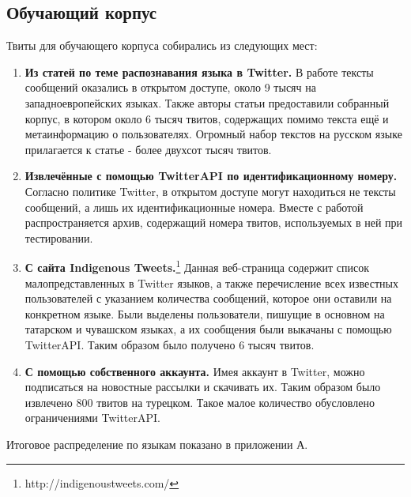 \documentclass[a4paper, 14pt]{article}
\begin{document}
		\subsection{Обучающий корпус}   
			Твиты для обучающего корпуса собирались из следующих мест:
			\begin{enumerate}
				\item \textbf{Из статей по теме распознавания языка в Twitter.} В работе \cite{liga} тексты сообщений оказались в открытом доступе, около 9 тысяч на западноевропейских языках. Также авторы статьи \cite{ppm} предоставили собранный корпус, в котором около 6 тысяч твитов, содержащих помимо текста ещё и метаинформацию о пользователях. Огромный набор текстов на русском языке прилагается к статье \cite{julia} - более двухсот тысяч твитов.
				\item \textbf{Извлечённые с помощью TwitterAPI по идентификационному номеру.} Согласно политике Twitter, в открытом доступе могут находиться не тексты сообщений, а лишь их идентификационные номера. Вместе с работой \cite{lrev} распространяется архив, содержащий номера твитов, используемых в ней при тестировании. 
				\item \textbf{С сайта Indigenous Tweets.}\footnote{http://indigenoustweets.com/} Данная веб-страница содержит список малопредставленных в Twitter языков, а также перечисление всех известных пользователей с указанием количества сообщений, которое они оставили на конкретном языке. Были выделены пользователи, пишущие в основном на татарском и чувашском языках, а их сообщения были выкачаны с помощью TwitterAPI. Таким образом было получено 6 тысяч твитов.
				\item \textbf{С помощью собственного аккаунта.} Имея аккаунт в Twitter, можно подписаться на новостные рассылки и скачивать их. Таким образом было извлечено 800 твитов на турецком. Такое малое количество обусловлено ограничениями TwitterAPI.
			\end{enumerate}		
			Итоговое распределение по языкам показано в приложении А.	  
			 
		
			
\end{document}
